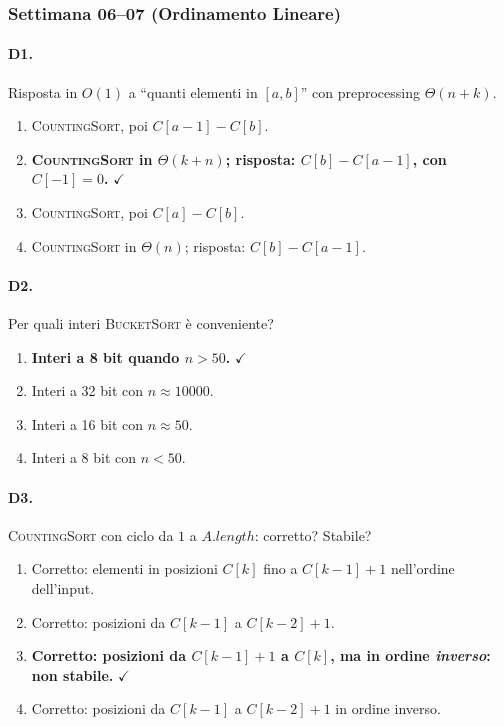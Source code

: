 \subsubsection{Settimana 06--07 (Ordinamento Lineare)}

\paragraph{D1.} Risposta in $O(1)$ a ``quanti elementi in $[a,b]$'' con preprocessing $\Theta(n+k)$.
\begin{enumerate}[label=\Alph*.,leftmargin=*]
	\item \textsc{CountingSort}, poi $C[a-1]-C[b]$.
	\item \textcolor{correctgreen}{\textbf{\textsc{CountingSort} in $\Theta(k+n)$; risposta: $C[b]-C[a-1]$, con $C[-1]=0$.}} \hfill\textcolor{correctgreen}{$\checkmark$}
	\item \textsc{CountingSort}, poi $C[a]-C[b]$.
	\item \textsc{CountingSort} in $\Theta(n)$; risposta: $C[b]-C[a-1]$.
\end{enumerate}

\paragraph{D2.} Per quali interi \textsc{BucketSort} \`e conveniente?
\begin{enumerate}[label=\Alph*.,leftmargin=*]
	\item \textcolor{correctgreen}{\textbf{Interi a 8 bit quando $n > 50$.}} \hfill\textcolor{correctgreen}{$\checkmark$}
	\item Interi a 32 bit con $n \approx 10000$.
	\item Interi a 16 bit con $n \approx 50$.
	\item Interi a 8 bit con $n < 50$.
\end{enumerate}

\paragraph{D3.} \textsc{CountingSort} con ciclo da $1$ a $A.\mathit{length}$: corretto? Stabile?
\begin{enumerate}[label=\Alph*.,leftmargin=*]
	\item Corretto: elementi in posizioni $C[k]$ fino a $C[k-1]+1$ nell'ordine dell'input.
	\item Corretto: posizioni da $C[k-1]$ a $C[k-2]+1$.
	\item \textcolor{correctgreen}{\textbf{Corretto: posizioni da $C[k-1]+1$ a $C[k]$, ma in ordine \emph{inverso}: non stabile.}} \hfill\textcolor{correctgreen}{$\checkmark$}
	\item Corretto: posizioni da $C[k-1]$ a $C[k-2]+1$ in ordine inverso.
\end{enumerate}

